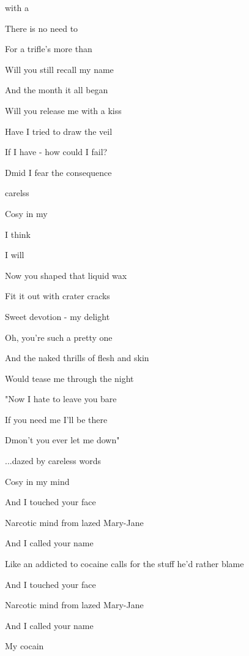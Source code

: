 

\zs

 with a                                 

There is no need to 

For a trifle's more than 
\ks

\zs
Will you still recall my name

And the month it all began

Will you release me with a kiss
\ks

\zs
Have I tried to draw the veil

If I have - how could I fail?

Dmid I fear the consequence
\ks

\zr
{} carelss          

Cosy in my  

             

I think          

I will 
\kr

\zs
Now you shaped that liquid wax

Fit it out with crater cracks

Sweet devotion - my delight
\ks

\zs
Oh, you're such a pretty one

And the naked thrills of flesh and skin

Would tease me through the night
\ks

\zs
"Now I hate to leave you bare

If you need me I'll be there

Dmon't you ever let me down"
\ks

\zs
...dazed by careless words

Cosy in my mind
\ks

\zs
And I touched your face

Narcotic mind from lazed Mary-Jane
\ks

\zs
And I called your name

Like an addicted to cocaine calls for the stuff he'd rather blame
\ks

\zs
And I touched your face

Narcotic mind from lazed Mary-Jane
\ks

\zs
And I called your name

My cocain 
\ks

\kp
